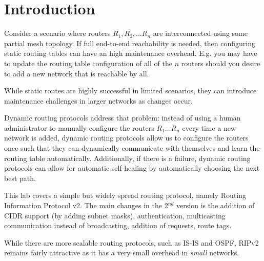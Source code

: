 \documentclass[pdftex,12pt,a4paper]{article}
\begin{document}
    \section{Introduction}
        Consider a scenario where routers $R_1, R_2, \ldots R_n$ are
        interconnected using some partial mesh topology. If full end-to-end
        reachability is needed, then configuring static routing tables can
        have an high maintenance overhead. E.g. you may have to update the
        routing table configuration of all of the $n$ routers should you desire
        to add a new network that is reachable by all.

        While static routes are highly successful in limited scenarios, they
        can introduce maintenance challenges in larger networks as changes
        occur.

        Dynamic routing protocols address that problem: instead of using a
        human administrator to manually configure the routers $R_1 \ldots R_n$
        every time a new network is added, dynamic routing protocols allow us
        to configure the routers once such that they can dynamically
        communicate with themselves and learn the routing table automatically.
        Additionally, if there is a failure, dynamic routing protocols can
        allow for automatic self-healing by automatically choosing the next best
        path. 

        This lab covers a simple but widely spread routing protocol, namely
        Routing Information Protocol v2. The main changes in the 2$^{nd}$
        version is the addition of CIDR support (by adding subnet masks),
        authentication, multicasting communication instead of broadcasting,
        addition of requests,  route tags.

        While there are more scalable routing protocols, such as IS-IS and
        OSPF, RIPv2 remains fairly attractive as it has a very small overhead
        in \emph{small} networks.
\end{document}
